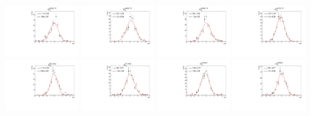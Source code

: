 \begin{figure}[h]\centering
    \includegraphics[width=0.24\textwidth]{figure/io/alpha/pull_alpha_Delta_1232_pp.pdf}
    \includegraphics[width=0.24\textwidth]{figure/io/alpha/pull_alpha_Delta_1600_pp.pdf}
    \includegraphics[width=0.24\textwidth]{figure/io/alpha/pull_alpha_Delta_1620_pp.pdf}
    \includegraphics[width=0.24\textwidth]{figure/io/alpha/pull_alpha_Delta_1700_pp.pdf}
    \includegraphics[width=0.24\textwidth]{figure/io/alpha/pull_alpha_K_1430_0.pdf}
    \includegraphics[width=0.24\textwidth]{figure/io/alpha/pull_alpha_K_700_0.pdf}
    \includegraphics[width=0.24\textwidth]{figure/io/alpha/pull_alpha_Lambda_1405_0.pdf}
    \includegraphics[width=0.24\textwidth]{figure/io/alpha/pull_alpha_Lambda_1520_0.pdf}

\end{figure}

